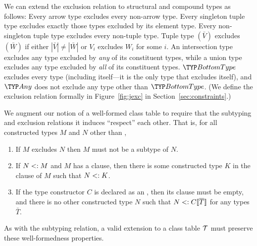 We can extend the exclusion relation 
to structural and compound types as follows:
Every arrow type excludes every non-arrow type.
Every singleton tuple type excludes exactly those types excluded by its element type.
Every non-singleton tuple type excludes every non-tuple type.
Tuple type $(\bar{V})$ excludes $(\bar{W})$ if either $|\bar{V}| \neq |\bar{W}|$
or $V_i$ excludes $W_i$ for some $i$. An intersection type excludes any type excluded by \emph{any} of its constituent types, 
while a union type excludes any type excluded by \emph{all} of its constituent types.
$\BottomType$ excludes every type (including itself---it is the only type 
that excludes itself), 
and $\Any$ does not exclude any type other than $\BottomType$.
(We define the exclusion relation formally in Figure~\ref{fig:jexc}
in Section~\ref{sec:constraints}.)

We augment our notion of a well-formed class table 
to require that the subtyping and exclusion relations it induces 
``respect'' each other.
That is, for all constructed types $M$ and $N$ other than \BottomType, 
\begin{enumerate}
\item  If $M$ excludes $N$ then $M$ must not be a subtype of $N$.


\item 
If $N <: M$ and $M$ has a  clause,
then there is some constructed type $K$ in the  clause of $M$
such that $N <: K$.

\item
If the type constructor $C$ is declared as an , then its 
clause must be empty, and there is no other constructed type $N$ such that
$N <: C\llbracket \overline{T} \rrbracket$ for any types $\bar{T}$.

\end{enumerate}
As with the subtyping relation, 
a valid extension to a class table $\mathcal{T}$ 
must preserve these well-formedness properties.

